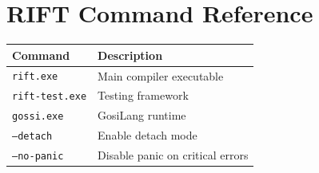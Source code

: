 \documentclass[12pt]{article}
\begin{document}
\section{RIFT Command Reference}
\begin{table}[H]
\centering
\begin{tabular}{|l|l|}
\hline
\textbf{Command} & \textbf{Description} \\
\hline
\texttt{rift.exe} & Main compiler executable \\
\hline
\texttt{rift-test.exe} & Testing framework \\
\hline
\texttt{gossi.exe} & GosiLang runtime \\
\hline
\texttt{--detach} & Enable detach mode \\
\hline
\texttt{--no-panic} & Disable panic on critical errors \\
\hline
\end{tabular}
\end{table}
\end{document}

